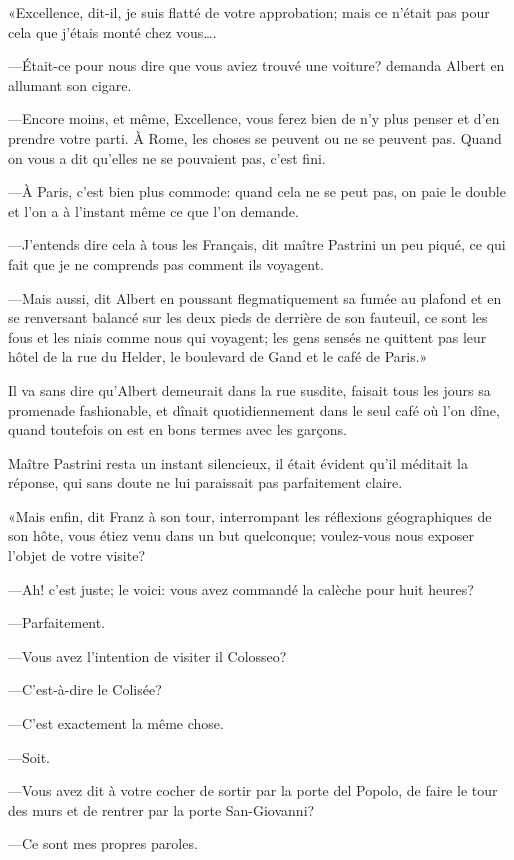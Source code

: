 «Excellence, dit-il, je suis flatté de votre approbation; mais ce n'était pas pour cela que j'étais monté chez vous\dots. 

—Était-ce pour nous dire que vous aviez trouvé une voiture? demanda Albert en allumant son cigare. 

—Encore moins, et même, Excellence, vous ferez bien de n'y plus penser et d'en prendre votre parti. À Rome, les choses se peuvent ou ne se peuvent pas. Quand on vous a dit qu'elles ne se pouvaient pas, c'est fini. 

—À Paris, c'est bien plus commode: quand cela ne se peut pas, on paie le double et l'on a à l'instant même ce que l'on demande. 

—J'entends dire cela à tous les Français, dit maître Pastrini un peu piqué, ce qui fait que je ne comprends pas comment ils voyagent. 

—Mais aussi, dit Albert en poussant flegmatiquement sa fumée au plafond et en se renversant balancé sur les deux pieds de derrière de son fauteuil, ce sont les fous et les niais comme nous qui voyagent; les gens sensés ne quittent pas leur hôtel de la rue du Helder, le boulevard de Gand et le café de Paris.» 

Il va sans dire qu'Albert demeurait dans la rue susdite, faisait tous les jours sa promenade fashionable, et dînait quotidiennement dans le seul café où l'on dîne, quand toutefois on est en bons termes avec les garçons. 

Maître Pastrini resta un instant silencieux, il était évident qu'il méditait la réponse, qui sans doute ne lui paraissait pas parfaitement claire. 

«Mais enfin, dit Franz à son tour, interrompant les réflexions géographiques de son hôte, vous étiez venu dans un but quelconque; voulez-vous nous exposer l'objet de votre visite? 

—Ah! c'est juste; le voici: vous avez commandé la calèche pour huit heures? 

—Parfaitement. 

—Vous avez l'intention de visiter il Colosseo? 

—C'est-à-dire le Colisée? 

—C'est exactement la même chose. 

—Soit. 

—Vous avez dit à votre cocher de sortir par la porte del Popolo, de faire le tour des murs et de rentrer par la porte San-Giovanni? 

—Ce sont mes propres paroles. 

